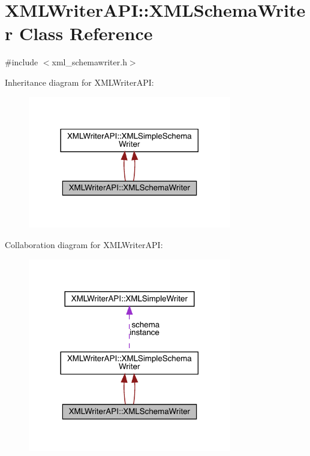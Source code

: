 \hypertarget{classXMLWriterAPI_1_1XMLSchemaWriter}{}\section{X\+M\+L\+Writer\+A\+PI\+:\+:X\+M\+L\+Schema\+Writer Class Reference}
\label{classXMLWriterAPI_1_1XMLSchemaWriter}


{\ttfamily \#include $<$xml\+\_\+schemawriter.\+h$>$}



Inheritance diagram for X\+M\+L\+Writer\+A\+PI\+:\nopagebreak
\begin{figure}[H]
\begin{center}
\leavevmode
\includegraphics[width=252pt]{de/d07/classXMLWriterAPI_1_1XMLSchemaWriter__inherit__graph}
\end{center}
\end{figure}


Collaboration diagram for X\+M\+L\+Writer\+A\+PI\+:\nopagebreak
\begin{figure}[H]
\begin{center}
\leavevmode
\includegraphics[width=252pt]{de/dbe/classXMLWriterAPI_1_1XMLSchemaWriter__coll__graph}
\end{center}
\end{figure}
